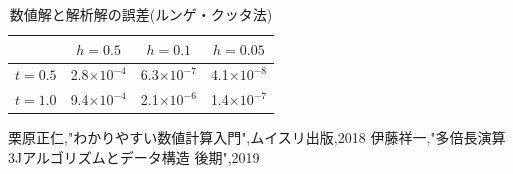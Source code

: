 \documentclass[dvipdfmx]{jarticle}
\begin{document}
  \begin{table}[H]
    \caption{数値解と解析解の誤差(ルンゲ・クッタ法)}
  \label{RKgosal}
  \begin{center}
      \begin{tabular}{c|c|c|c}\hline 
        & $h=0.5$ & $h=0.1$ & $h=0.05$ \\ \hline \hline 
        $t=0.5$ & 2.8$\times10^{-4}$ & 6.3$\times10^{-7}$ & 4.1$\times10^{-8}$ \\ 
        $t=1.0$ & 9.4$\times10^{-4}$ & 2.1$\times10^{-6}$ & 1.4$\times10^{-7}$ \\ \hline
      \end{tabular}
  \end{center}
  \end{table}    







        \begin{thebibliography}{9}
            栗原正仁,"わかりやすい数値計算入門",ムイスリ出版,2018
            伊藤祥一,"多倍長演算 3Jアルゴリズムとデータ構造 後期",2019
          \end{thebibliography}
\end{document}
